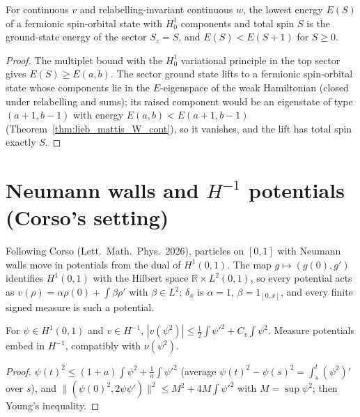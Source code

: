 \begin{theorem}
  \label{thm:lieb_mattis_total_W_cont}
  \leanok
  For continuous $v$ and relabelling-invariant continuous $w$, the lowest energy $E(S)$ of a fermionic spin-orbital
  state with $H^1_0$ components and total spin $S$ is the ground-state energy of the sector $S_z=S$, and
  $E(S)<E(S+1)$ for $S\ge0$.
\end{theorem}
\begin{proof}
  \leanok
  The multiplet bound with the $H^1_0$ variational principle in the top sector gives $E(S)\ge E(a,b)$. The sector ground
  state lifts to a fermionic spin-orbital state whose components lie in the $E$-eigenspace of the weak Hamiltonian
  (closed under relabelling and sums); its raised component would be an eigenstate of type $(a+1,b-1)$ with energy
  $E(a,b)<E(a+1,b-1)$ (Theorem~\ref{thm:lieb_mattis_W_cont}), so it vanishes, and the lift has total spin exactly $S$.
\end{proof}


\section{Neumann walls and $H^{-1}$ potentials (Corso's setting)}

Following Corso (Lett.\ Math.\ Phys.\ 2026), particles on $[0,1]$ with Neumann walls move in potentials from the
dual of $H^1(0,1)$. The map $g\mapsto(g(0),g')$ identifies $H^1(0,1)$ with the Hilbert space $\mathbb R\times L^2(0,1)$,
so every potential acts as $v(\rho)=\alpha\rho(0)+\int\beta\rho'$ with $\beta\in L^2$; $\delta_x$ is $\alpha=1$,
$\beta=1_{[0,x]}$, and every finite signed measure is such a potential.

\begin{theorem}
  \label{thm:neu_form_bound}
  \leanok
  For $\psi\in H^1(0,1)$ and $v\in H^{-1}$, $|v(\psi^2)|\le\frac12\int\psi'^2+C_v\int\psi^2$. Measure potentials embed in
  $H^{-1}$, compatibly with $\nu(\psi^2)$.
\end{theorem}
\begin{proof}
  \leanok
  $\psi(t)^2\le(1+a)\int\psi^2+\frac1a\int\psi'^2$ (average $\psi(t)^2-\psi(s)^2=\int_s^t(\psi^2)'$ over $s$), and
  $\|(\psi(0)^2,2\psi\psi')\|^2\le M^2+4M\int\psi'^2$ with $M=\sup\psi^2$; then Young's inequality.
\end{proof}

